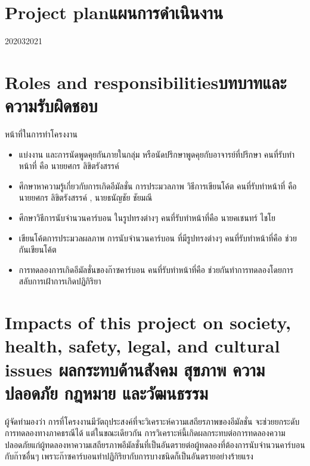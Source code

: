 \section{\ifenglish Project plan\else แผนการดำเนินงาน\fi}

\begin{plan}{10}{2020}{3}{2021}
\end{plan}

\section{\ifenglish Roles and responsibilities\else บทบาทและความรับผิดชอบ\fi}

หน้าที่ในการทำโครงงาน

\begin{itemize}
    \item {แบ่งงาน และการนัดพูดคุยกันภายในกลุ่ม หรือนัดปรึกษาพูดคุยกับอาจารย์ที่ปรึกษา คนที่รับทำหน้าที่ คือ นายยศกร ลิขิตรังสรรค์}
    \item {ศึกษาหาความรู้เกี่ยวกับการเกิดอีมัลชั่น การประมวลภาพ วิธีการเขียนโค้ต คนที่รับทำหน้าที่ คือ นายยศกร ลิขิตรังสรรค์ , นายธนัญชัย ชัยมณี}
    \item {ศึกษาวิธีการนับจำนวนคาร์บอน ในรูปทรงต่างๆ คนที่รับทำหน้าที่คือ นายคเชนทร์ ไชโย}
    \item {เขียนโค้ตการประมวลผลภาพ การนับจำนวนคาร์บอน ที่มีรูปทรงต่างๆ  คนที่รับทำหน้าที่คือ ช่วยกันเขียนโค้ต}
    \item {การทดลองการเกิดอีมัลชั่นของก๊าซคาร์บอน  คนที่รับทำหน้าที่คือ ช่วยกันทำการทดลองโดยการสลับการเฝ้าการเกิดปฏิกิริยา}
\end{itemize}

\section{\ifenglish%
Impacts of this project on society, health, safety, legal, and cultural issues
\else%
ผลกระทบด้านสังคม สุขภาพ ความปลอดภัย กฎหมาย และวัฒนธรรม
\fi}

\hspace{0.5 cm}ผู้จัดทํามองว่า การที่โครงงานมีวัตถุประสงค์ที่จะวิเคราะห์ความเสถียรภาพของอีมัลชั่น จะช่วยยกระดับการทดลองทางภาคธรณีได้ แต่ในขณะเดียวกัน การวิเคราะห์นี้เกิดผลกระทบต่อการทดลองความปลอดภัยแก่ผู้ทดลองหาความเสถียรภาพอีมัลชั่นที่เป็นอันตรายต่อผู้ทดลองที่ต้องการนับจำนวนคาร์บอนกับก๊าซอื่นๆ เพราะก๊าซคาร์บอนทำปฏิกิริยากับการบางชนิดก็เป็นอันตรายอย่างร้ายแรง